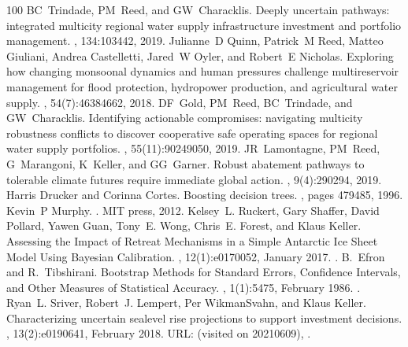 \documentclass[letterpaper,10pt,english]{sphinxmanual}
\begin{document}
\begin{sphinxthebibliography}{100}
\sphinxAtStartPar
BC Trindade, PM Reed, and GW Characklis. Deeply uncertain pathways: integrated multi\sphinxhyphen{}city regional water supply infrastructure investment and portfolio management. , 134:103442, 2019.
\sphinxAtStartPar
Julianne D Quinn, Patrick M Reed, Matteo Giuliani, Andrea Castelletti, Jared W Oyler, and Robert E Nicholas. Exploring how changing monsoonal dynamics and human pressures challenge multireservoir management for flood protection, hydropower production, and agricultural water supply. , 54(7):4638\textendash{}4662, 2018.
\sphinxAtStartPar
DF Gold, PM Reed, BC Trindade, and GW Characklis. Identifying actionable compromises: navigating multi\sphinxhyphen{}city robustness conflicts to discover cooperative safe operating spaces for regional water supply portfolios. , 55(11):9024\textendash{}9050, 2019.
\sphinxAtStartPar
JR Lamontagne, PM Reed, G Marangoni, K Keller, and GG Garner. Robust abatement pathways to tolerable climate futures require immediate global action. , 9(4):290\textendash{}294, 2019.
\sphinxAtStartPar
Harris Drucker and Corinna Cortes. Boosting decision trees. , pages 479\textendash{}485, 1996.
\sphinxAtStartPar
Kevin P Murphy. . MIT press, 2012.
\sphinxAtStartPar
Kelsey L. Ruckert, Gary Shaffer, David Pollard, Yawen Guan, Tony E. Wong, Chris E. Forest, and Klaus Keller. Assessing the Impact of Retreat Mechanisms in a Simple Antarctic Ice Sheet Model Using Bayesian Calibration. , 12(1):e0170052, January 2017. .
\sphinxAtStartPar
B. Efron and R. Tibshirani. Bootstrap Methods for Standard Errors, Confidence Intervals, and Other Measures of Statistical Accuracy. , 1(1):54\textendash{}75, February 1986. .
\sphinxAtStartPar
Ryan L. Sriver, Robert J. Lempert, Per Wikman\sphinxhyphen{}Svahn, and Klaus Keller. Characterizing uncertain sea\sphinxhyphen{}level rise projections to support investment decisions. , 13(2):e0190641, February 2018. URL:  (visited on 2021\sphinxhyphen{}06\sphinxhyphen{}09), .

\end{sphinxthebibliography}
\end{document}
